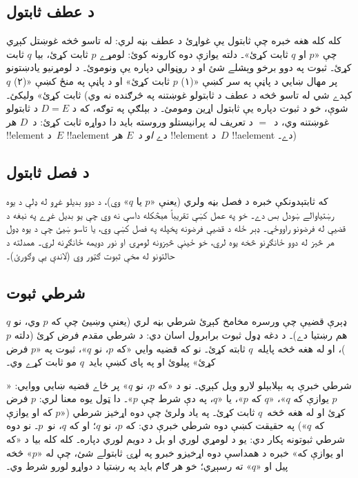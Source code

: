\documentclass[../../../include/open-logic-section]{subfiles}
\begin{document}
\subsection{د عطف ثابتول}

کله کله هغه خبره چې ثابتول يې غواړئ د عطف
بڼه لري: له تاسو څخه غوښتل کېږي چې «$p$ او
$q$ ثابت کړئ»۔ دلته يوازې دوه کارونه کوئ:
لومړے $p$ ثابت کړئ، بيا $q$ ثابت کړئ۔ ثبوت
په دوو برخو وېشلے شئ او د روڼوالي دپاره يې
ونوموئ۔ د لومړنيو يادښتونو پر مهال ښايي د پاڼې
په سر کښې «(۱) $p$ ثابت کړئ» او د پاڼې په منځ
کښې «(۲) $q$ ثابت کړئ» وليکئ۔ (کېدے شي له
تاسو څخه د عطف د ثابتولو غوښتنه په څرګنده
نه وي شوې، خو د ثبوت دپاره يې ثابتول اړين
ومومئ۔ د بېلګې په توګه، که د $D = E$ د ثابتولو
غوښتنه وي، د~$=$ د تعريف له پرانيستلو وروسته
بايد دا دواړه ثابت کړئ: د~$D$ هر !!{element}
د~$E$ !!a{element} دے \emph{او} د~$E$ هر
!!{element} د~$D$ !!a{element} دے۔)

\subsection{د فصل ثابتول}

که ثابتېدونکې خبره د فصل بڼه ولري (يعنې
«$p$ يا $q$» وي)، د دوو بديلو غړو له ډلې
د يوه رښتياوالے ښودل بس دے۔ خو په عمل کښې
تقريباً هېڅکله داسې نه وي چې يو بديل غړے
په نېغه د قضيې له فرضونو راووځي۔ ډېر ځله
د قضيې فرضونه پخپله په فصل کښې وي، يا تاسو
ښيئ چې د يوه ډول هر څيز له دوو ځانګړنو څخه
يوه لري، خو ځينې څيزونه لومړۍ او نور دويمه
ځانګړنه لري۔ همدلته د حالتونو له مخې ثبوت
ګټور وي (لاندې يې وګورئ)۔

\subsection{شرطي ثبوت}

ډېرې قضيې چې ورسره مخامخ کېږئ شرطي بڼه
لري (يعنې وښيئ چې که $p$ وي، نو $q$ هم
رښتيا دے)۔ د دغه ډول ثبوت برابرول اسان دي:
د شرطي مقدم فرض کړئ (دلته $p$)، او له هغه
څخه پايله~$q$ ثابته کړئ۔ نو که قضيه وايي
«که $p$، نو $q$»، ثبوت په «$p$ فرض کړئ»
پيلوئ او په پای کښې بايد~$q$ مو ثابت کړے وي۔

شرطي خبرې په بېلابېلو لارو ويل کېږي۔ نو د
«که $p$، نو $q$» پر ځاے قضيه ښايي ووايي:
«$p$ يوازې که $q$»، «$q$ که $p$»، يا
«$q$، په دې شرط چې $p$»۔ دا ټول يوه معنا
لري: $p$ فرض کړئ او له هغه څخه~$q$ ثابت
کړئ۔ په ياد ولرئ چې دوه اړخيز شرطي («$p$
که او يوازې که $q$») په حقيقت کښې دوه
شرطي خبرې دي: که $p$، نو $q$؛ او که $q$،
نو~$p$۔ نو دوه شرطي ثبوتونه پکار دي: يو
د لومړي لوري او بل د دويم لوري دپاره۔
کله کله بيا د «که او يوازې که» خبره د
همداسې دوه اړخيزو خبرو په لړۍ ثابتولے شئ،
چې له «$p$» څخه پيل او «$q$» ته رسېږي؛
خو هر ګام بايد په رښتيا د دواړو لورو
شرط وي۔
\end{document}
